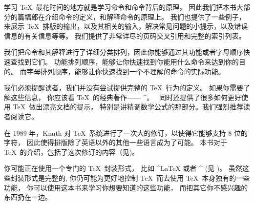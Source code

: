学习 \TeX\ 最花时间的地方就是学习命令和命令背后的原理。
因此我们把本书大部分的篇幅郎在介绍命令的定义，和解释命令的原理上。
我们也提供了一些例子，来展示 \TeX\ 排版的输出，以及其相关的输入，解决常见问题的小提示，以及错误信息的有关信息等等。
我们提供了非常详尽的页码交叉引用和完整的索引列表。

我们把命令和其解释进行了详细分类排列，因此你能够通过其功能或者字母顺序快速查找到它们。
功能排列顺序，能够让你快速找到你能用什么命令来达到你的目的。
而字母排列顺序，能够让你快速找到一个不理解的命令的实际功能。

我们必须提醒读者，我们并没有尝试提供完整的 \TeX\ 行为的定义。
如果你需要了解这些信息， 你应该看 \TeX\ 的经典著作—— ^{\texbook}。
\texbook\ 同时还提供了很多如何更好使用 \TeX\ 做出漂亮文档的提示，
特别是讲精调数学公式的那部分。我们强烈推荐读者阅读它。

在 1989 年，Knuth 对 \TeX\ 系统进行了一次大的修订，以使得它能够支持 $8$ 位的字符，
因此使得排版除了英语以外的其他一些语言成为了可能。
本书对于 \TeX\ 的介绍，包括了这次修订的内容（见)。

你可能正在使用一个专门的 \TeX\ 封装形式，
比如 ^{\LaTeX} 或者 ^{\AMSTeX} (见 )。
虽然这些封装形式是完整的, 你仍可能为更好地控制 \TeX\ 而去使用 \TeX\ 本身独有的一些功能，
你可以使用这本书来学习你想要知道的这些功能，
而把其它你不感兴趣的东西扔在一边。

